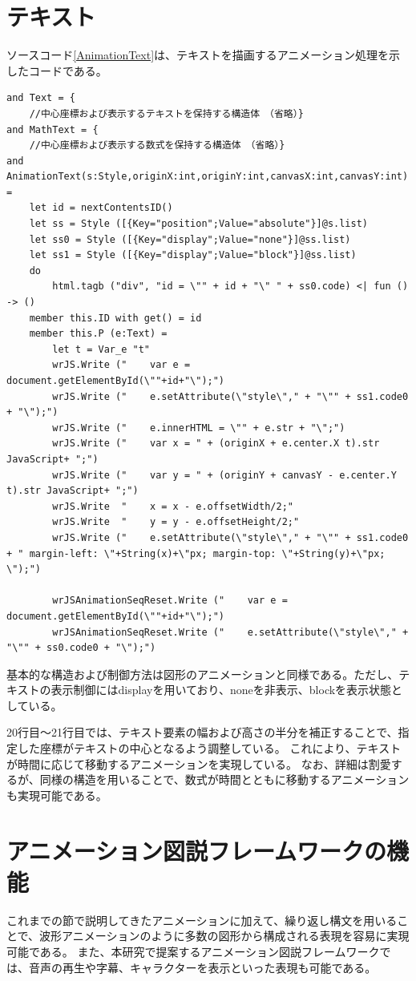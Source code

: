 \section{テキスト}
ソースコード\ref{AnimationText}は、テキストを描画するアニメーション処理を示したコードである。
 \begin{lstlisting}[caption={テキストを描画するアニメーション（fsファイル）},label={AnimationText},breaklines=true,breakatwhitespace=false]
and Text = {
    //中心座標および表示するテキストを保持する構造体　（省略）}
and MathText = {
    //中心座標および表示する数式を保持する構造体　（省略）}
and AnimationText(s:Style,originX:int,originY:int,canvasX:int,canvasY:int) =
    let id = nextContentsID()
    let ss = Style ([{Key="position";Value="absolute"}]@s.list)
    let ss0 = Style ([{Key="display";Value="none"}]@ss.list)
    let ss1 = Style ([{Key="display";Value="block"}]@ss.list)
    do
        html.tagb ("div", "id = \"" + id + "\" " + ss0.code) <| fun () -> ()
    member this.ID with get() = id
    member this.P (e:Text) = 
        let t = Var_e "t"
        wrJS.Write ("    var e = document.getElementById(\""+id+"\");")
        wrJS.Write ("    e.setAttribute(\"style\"," + "\"" + ss1.code0 + "\");")
        wrJS.Write ("    e.innerHTML = \"" + e.str + "\";")
        wrJS.Write ("    var x = " + (originX + e.center.X t).str JavaScript+ ";")
        wrJS.Write ("    var y = " + (originY + canvasY - e.center.Y t).str JavaScript+ ";")
        wrJS.Write  "    x = x - e.offsetWidth/2;"
        wrJS.Write  "    y = y - e.offsetHeight/2;"
        wrJS.Write ("    e.setAttribute(\"style\"," + "\"" + ss1.code0 + " margin-left: \"+String(x)+\"px; margin-top: \"+String(y)+\"px; \");")
        
        wrJSAnimationSeqReset.Write ("    var e = document.getElementById(\""+id+"\");")
        wrJSAnimationSeqReset.Write ("    e.setAttribute(\"style\"," + "\"" + ss0.code0 + "\");")
\end{lstlisting}
基本的な構造および制御方法は図形のアニメーションと同様である。ただし、テキストの表示制御にはdisplayを用いており、noneを非表示、blockを表示状態としている。
\par
20行目～21行目では、テキスト要素の幅および高さの半分を補正することで、指定した座標がテキストの中心となるよう調整している。
これにより、テキストが時間に応じて移動するアニメーションを実現している。
なお、詳細は割愛するが、同様の構造を用いることで、数式が時間とともに移動するアニメーションも実現可能である。

\section{アニメーション図説フレームワークの機能}
これまでの節で説明してきたアニメーションに加えて、繰り返し構文を用いることで、波形アニメーションのように多数の図形から構成される表現を容易に実現可能である。
また、本研究で提案するアニメーション図説フレームワークでは、音声の再生や字幕、キャラクターを表示といった表現も可能である。
